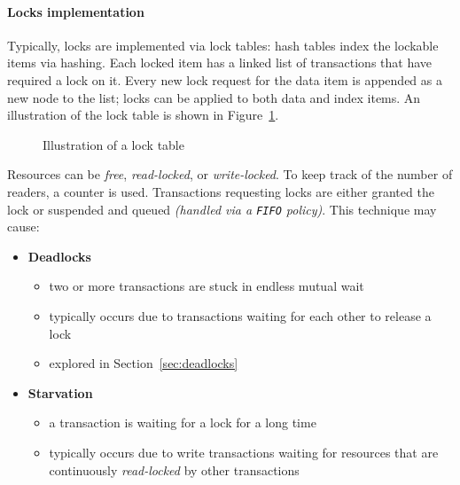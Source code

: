 \documentclass[english]{article}
\begin{document}
\paragraph{Locks implementation}

Typically, locks are implemented via lock tables: hash tables index the lockable items via hashing.
Each locked item has a linked list of transactions that have required a lock on it.
Every new lock request for the data item is appended as a new node to the list;
locks can be applied to both data and index items.
An illustration of the lock table is shown in Figure~\ref{fig:lock-table}.

\begin{figure}[htbp]
  \centering
  \bigskip
  \caption{Illustration of a lock table}
  \label{fig:lock-table}
  \bigskip
\end{figure}

Resources can be \textit{free}, \textit{read-locked}, or \textit{write-locked}.
To keep track of the number of readers, a counter is used.
Transactions requesting locks are either granted the lock or suspended and queued \textit{(handled via a \texttt{FIFO} policy)}.
This technique may cause:

\begin{itemize}
  \item \textbf{Deadlocks}
        \begin{itemize}
          \item two or more transactions are stuck in endless mutual wait
          \item typically occurs due to transactions waiting for each other to release a lock
          \item explored in Section~\ref{sec:deadlocks}
        \end{itemize}
  \item \textbf{Starvation}
        \begin{itemize}
          \item a transaction is waiting for a lock for a long time
          \item typically occurs due to write transactions waiting for resources that are continuously \textit{read-locked} by other transactions
        \end{itemize}
\end{itemize}
\end{document}
